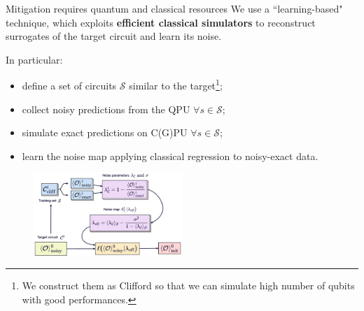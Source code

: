 \documentclass[aspectratio=169, 8pt, xcolor={svgnames}, hyperref={linkcolor=black}]{beamer}
\begin{document}
\begin{frame}{Mitigation requires quantum and classical resources}
We use a ``learning-based" technique, which exploits \textbf{efficient classical simulators} 
to reconstruct surrogates of the target circuit and learn its noise.

\begin{multicols}{2}
In particular:
\begin{itemize}[noitemsep]
\item[1.] define a set of circuits $\mathcal{S}$ similar to the target\footnote{We construct them as
Clifford so that we can simulate high number of qubits with good performances.};
\item[2.] collect noisy predictions from the QPU $\forall s \in \mathcal{S}$;
\item[3.] simulate exact predictions on C(G)PU $\forall s \in \mathcal{S}$;
\item[4.] learn the noise map applying classical regression to noisy-exact data. 
\end{itemize}
\begin{figure}
   \includegraphics[width=0.5\textwidth]{figures/ics.pdf}
\end{figure}
\end{multicols}
\end{frame}
\end{document}
